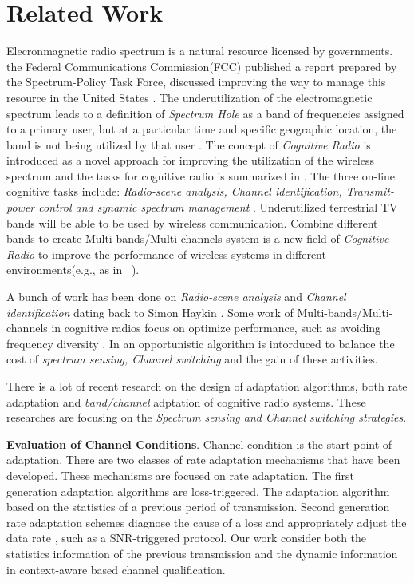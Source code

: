 \section{Related Work}
\label{sec:related}

Elecronmagnetic radio spectrum is a natural resource licensed by governments.  the Federal Communications Commission(FCC) published a report prepared by the Spectrum-Policy Task Force, discussed improving the way to manage this resource in the United States \cite{federal2002spectrum}. The underutilization of the electromagnetic spectrum leads to a definition of \emph{Spectrum Hole} as a band of frequencies assigned to a primary user, but at a particular time and specific geographic location, the band is not being utilized by that user \cite{kolodzy2001next}.
The concept of \emph{Cognitive Radio} is introduced as a novel approach for improving the utilization of the wireless spectrum and the tasks for cognitive radio is summarized in \cite{haykin2005cognitive}. The three on-line cognitive tasks include: \emph{Radio-scene analysis, Channel identification, Transmit-power control and synamic spectrum management} \cite{haykin2005cognitive}.
Underutilized terrestrial TV bands will be able to be used by wireless communication. Combine different bands to create Multi-bands/Multi-channels system is a new field of \emph{Cognitive Radio} to improve the performance of wireless systems in different
environments(e.g., as in ~\cite{MOAR}). 

A bunch of work has been done on \emph{Radio-scene analysis} and \emph{Channel identification} dating back to Simon Haykin \cite{haykin2005cognitive}.
Some work of Multi-bands/Multi-channels in
cognitive radios focus on optimize performance, such as avoiding frequency diversity \cite{rahul2009frequency}. 
In \cite{OAR} an opportunistic algorithm is intorduced to balance the cost of \emph{spectrum sensing, Channel switching} and the gain of these activities.

There is a lot of recent research on the design of adaptation algorithms, both rate adaptation and \emph{band/channel} adptation of cognitive radio systems. These researches are focusing on the \emph{Spectrum sensing and Channel switching strategies}.

\textbf{Evaluation of Channel Conditions}. Channel condition is the start-point of adaptation. There are two classes of rate adaptation mechanisms that have been developed. These mechanisms are focused on rate adaptation. The first generation adaptation algorithms are loss-triggered. The adaptation algorithm based on the statistics of a previous period of transmission. Second generation rate adaptation schemes diagnose the cause of a loss and appropriately adjust the data rate \cite{biaz2008rate, camp2010modulation}, such as a SNR-triggered protocol. Our work consider both the statistics information of the previous transmission and the dynamic information in context-aware based channel qualification.


